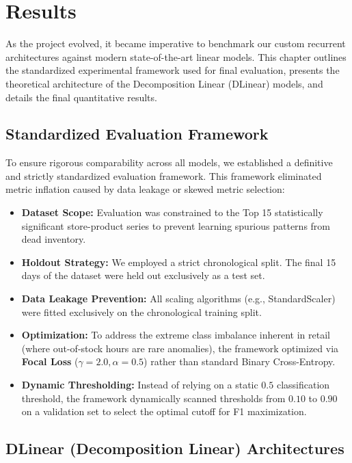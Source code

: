 \chapter{Results}
\label{chap:results}

As the project evolved, it became imperative to benchmark our custom recurrent architectures against modern state-of-the-art linear models. This chapter outlines the standardized experimental framework used for final evaluation, presents the theoretical architecture of the Decomposition Linear (DLinear) models, and details the final quantitative results.

\section{Standardized Evaluation Framework}

To ensure rigorous comparability across all models, we established a definitive and strictly standardized evaluation framework. This framework eliminated metric inflation caused by data leakage or skewed metric selection:
\begin{itemize}
    \item \textbf{Dataset Scope:} Evaluation was constrained to the Top 15 statistically significant store-product series to prevent learning spurious patterns from dead inventory.
    \item \textbf{Holdout Strategy:} We employed a strict chronological split. The final 15 days of the dataset were held out exclusively as a test set. 
    \item \textbf{Data Leakage Prevention:} All scaling algorithms (e.g., StandardScaler) were fitted exclusively on the chronological training split.
    \item \textbf{Optimization:} To address the extreme class imbalance inherent in retail (where out-of-stock hours are rare anomalies), the framework optimized via \textbf{Focal Loss} ($\gamma = 2.0, \alpha = 0.5$) rather than standard Binary Cross-Entropy.
    \item \textbf{Dynamic Thresholding:} Instead of relying on a static $0.5$ classification threshold, the framework dynamically scanned thresholds from $0.10$ to $0.90$ on a validation set to select the optimal cutoff for F1 maximization.
\end{itemize}

\section{DLinear (Decomposition Linear) Architectures}

